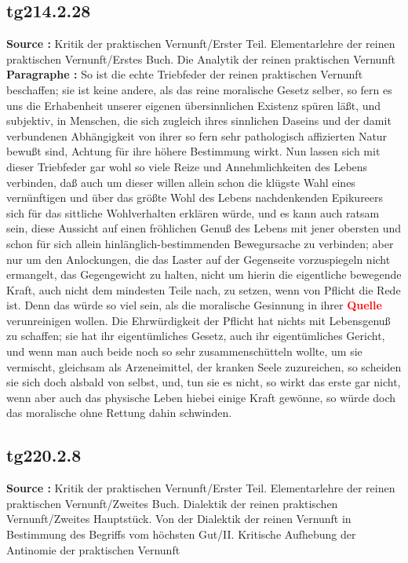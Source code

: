 \documentclass[a4paper,12pt,twoside]{book}
\newcommand{\match}[1]{\textcolor{red}{\textbf{#1}}}
\begin{document}
	\subsection*{tg214.2.28} 
	\textbf{Source : }Kritik der praktischen Vernunft/Erster Teil. Elementarlehre der reinen praktischen Vernunft/Erstes Buch. Die Analytik der reinen praktischen Vernunft\\  
	
	\noindent\textbf{Paragraphe : }So ist die echte Triebfeder der reinen praktischen Vernunft beschaffen; sie ist keine andere, als das reine moralische Gesetz selber, so fern es uns die Erhabenheit unserer eigenen übersinnlichen Existenz spüren läßt, und subjektiv,  in Menschen, die sich zugleich ihres sinnlichen Daseins und der damit verbundenen Abhängigkeit von ihrer so fern sehr pathologisch affizierten Natur bewußt sind, Achtung für ihre höhere Bestimmung wirkt. Nun lassen sich mit dieser Triebfeder gar wohl so viele Reize und Annehmlichkeiten des Lebens verbinden, daß auch um dieser willen allein schon die klügste Wahl eines vernünftigen und über das größte Wohl des Lebens nachdenkenden Epikureers sich für das sittliche Wohlverhalten erklären würde, und es kann auch ratsam sein, diese Aussicht auf einen fröhlichen Genuß des Lebens mit jener obersten und schon für sich allein hinlänglich-bestimmenden Bewegursache zu verbinden; aber nur um den Anlockungen, die das Laster auf der Gegenseite vorzuspiegeln nicht ermangelt, das Gegengewicht zu halten, nicht um hierin die eigentliche bewegende Kraft, auch nicht dem mindesten Teile nach, zu setzen, wenn von Pflicht die Rede ist. Denn das würde so viel sein, als die moralische Gesinnung in ihrer \match{Quelle} verunreinigen wollen. Die Ehrwürdigkeit der Pflicht hat nichts mit Lebensgenuß zu schaffen; sie hat ihr eigentümliches Gesetz, auch ihr eigentümliches Gericht, und wenn man auch beide noch so sehr zusammenschütteln wollte, um sie vermischt, gleichsam als Arzeneimittel, der kranken Seele zuzureichen, so scheiden sie sich doch alsbald von selbst, und, tun sie es nicht, so wirkt das erste gar nicht, wenn aber auch das physische Leben hiebei einige Kraft gewönne, so würde doch das moralische ohne Rettung dahin schwinden. 
	
	\subsection*{tg220.2.8} 
	\textbf{Source : }Kritik der praktischen Vernunft/Erster Teil. Elementarlehre der reinen praktischen Vernunft/Zweites Buch. Dialektik der reinen praktischen Vernunft/Zweites Hauptstück. Von der Dialektik der reinen Vernunft in Bestimmung des Begriffs vom höchsten Gut/II. Kritische Aufhebung der Antinomie der praktischen Vernunft\\  
	
\end{document}
